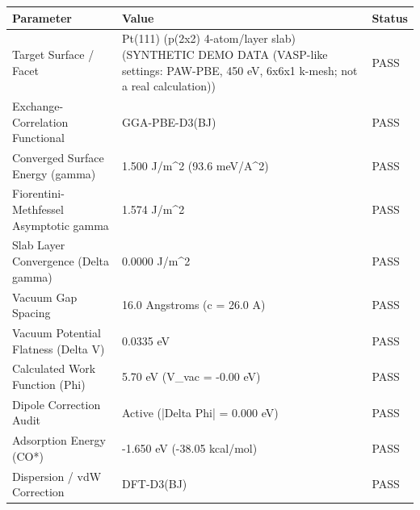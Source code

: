 \begin{tabular}{lll}
\toprule
Parameter & Value & Status \\
\midrule
Target Surface / Facet & Pt(111) (p(2x2) 4-atom/layer slab) (SYNTHETIC DEMO DATA (VASP-like settings: PAW-PBE, 450 eV, 6x6x1 k-mesh; not a real calculation)) & PASS \\
Exchange-Correlation Functional & GGA-PBE-D3(BJ) & PASS \\
Converged Surface Energy (gamma) & 1.500 J/m^2 (93.6 meV/A^2) & PASS \\
Fiorentini-Methfessel Asymptotic gamma & 1.574 J/m^2 & PASS \\
Slab Layer Convergence (Delta gamma) & 0.0000 J/m^2 & PASS \\
Vacuum Gap Spacing & 16.0 Angstroms (c = 26.0 A) & PASS \\
Vacuum Potential Flatness (Delta V) & 0.0335 eV & PASS \\
Calculated Work Function (Phi) & 5.70 eV (V_vac = -0.00 eV) & PASS \\
Dipole Correction Audit & Active (|Delta Phi| = 0.000 eV) & PASS \\
Adsorption Energy (CO*) & -1.650 eV (-38.05 kcal/mol) & PASS \\
Dispersion / vdW Correction & DFT-D3(BJ) & PASS \\
\bottomrule
\end{tabular}
